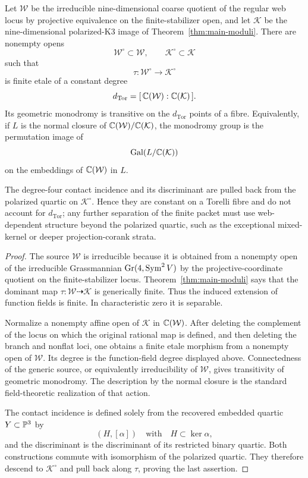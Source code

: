 \begin{theorem}
\label{thm:torelli-monodromy}
Let \(\mathcal W\) be the irreducible nine-dimensional coarse
quotient of the regular web locus by projective equivalence on the
finite-stabilizer open, and let \(\mathcal K\) be the
nine-dimensional polarized-K3 image of
Theorem~\ref{thm:main-moduli}.  There are nonempty opens
\[
 \mathcal W^\circ\subset\mathcal W,\qquad
 \mathcal K^\circ\subset\mathcal K
\]
such that
\[
 \tau:\mathcal W^\circ\longrightarrow\mathcal K^\circ
\]
is finite etale of a constant degree
\[
 d_{\mathrm{Tor}}
 =
 [\,\mathbb C(\mathcal W):\mathbb C(\mathcal K)\,].
\]
Its geometric monodromy is transitive on the \(d_{\mathrm{Tor}}\)
points of a fibre.  Equivalently, if \(L\) is the normal closure of
\(\mathbb C(\mathcal W)/\mathbb C(\mathcal K)\), the monodromy group is the
permutation image of
\[
 \operatorname{Gal}(L/\mathbb C(\mathcal K))
\]
on the embeddings of \(\mathbb C(\mathcal W)\) in \(L\).

The degree-four contact incidence and its discriminant are pulled back
from the polarized quartic on \(\mathcal K^\circ\).  Hence they are
constant on a Torelli fibre and do not account for
\(d_{\mathrm{Tor}}\); any further separation of the finite packet
must use web-dependent structure beyond the polarized quartic, such as
the exceptional mixed-kernel or deeper projection-corank strata.
\end{theorem}

\begin{proof}
The source \(\mathcal W\) is irreducible because it is obtained from a
nonempty open of the irreducible Grassmannian
\(\operatorname{Gr}(4,\operatorname{Sym}^2V)\) by the projective-coordinate quotient on the
finite-stabilizer locus.  Theorem~\ref{thm:main-moduli} says that the
dominant map \(\tau:\mathcal W\dashrightarrow\mathcal K\) is
generically finite.  Thus the induced extension of function fields is
finite.  In characteristic zero it is separable.

Normalize a nonempty affine open of \(\mathcal K\) in
\(\mathbb C(\mathcal W)\).  After deleting the complement of the locus on
which the original rational map is defined, and then deleting the
branch and nonflat loci, one obtains a finite etale morphism from a
nonempty open of \(\mathcal W\).  Its degree is the function-field
degree displayed above.  Connectedness of the generic source, or
equivalently irreducibility of \(\mathcal W\), gives transitivity of
geometric monodromy.  The description by the normal closure is the
standard field-theoretic realization of that action.

The contact incidence is defined solely from the recovered embedded
quartic \(Y\subset\mathbb P^3\) by
\[
 (H,[\alpha])\quad\text{with}\quad H\subset\ker\alpha,
\]
and the discriminant is the discriminant of its restricted binary
quartic.  Both constructions commute with isomorphism of the polarized
quartic.  They therefore descend to \(\mathcal K^\circ\) and pull
back along \(\tau\), proving the last assertion.
\end{proof}



